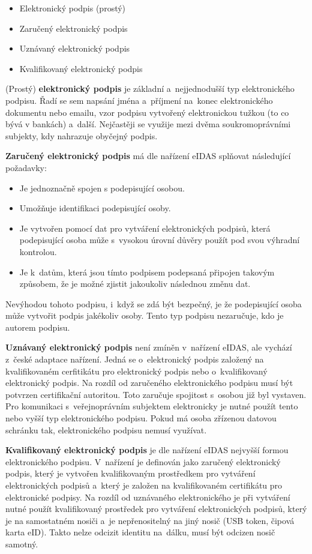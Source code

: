 \begin{itemize}
    \item Elektronický podpis (prostý)
    \item Zaručený elektronický podpis
    \item Uznávaný elektronický podpis
    \item Kvalifikovaný elektronický podpis
\end{itemize}

(Prostý) \textbf{elektronický podpis} je základní a~nejjednodušší typ elektronického podpisu. Řadí se sem napsání jména a~příjmení na~konec elektronického dokumentu nebo emailu, vzor podpisu vytvořený elektronickou tužkou (to co bývá v bankách) a~další. Nejčastěji se využije mezi dvěma soukromoprávními subjekty, kdy nahrazuje obyčejný podpis.

\textbf{Zaručený elektronický podpis} má dle nařízení eIDAS splňovat následující požadavky:

\begin{itemize}
    \item Je jednoznačně spojen s podepisující osobou.
    \item Umožňuje identifikaci podepisující osoby.
    \item Je vytvořen pomocí dat pro vytváření elektronických podpisů, která podepisující osoba může s~vysokou úrovní důvěry použít pod svou výhradní kontrolou.
    \item Je k~datům, která jsou tímto podpisem podepsaná připojen takovým způsobem, že je možné zjistit jakoukoliv následnou změnu dat.
\end{itemize}

Nevýhodou tohoto podpisu, i~když se zdá být bezpečný, je že podepisující osoba může vytvořit podpis jakékoliv osoby. Tento typ podpisu nezaručuje, kdo je autorem podpisu. 

\textbf{Uznávaný elektronický podpis} není zmíněn v~nařízení eIDAS, ale vychází z~české adaptace nařízení. Jedná se o~elektronický podpis založený na kvalifikovaném cerfitikátu pro elektronický podpis nebo o~kvalifikovaný elektronický podpis. Na rozdíl od zaručeného elektronického podpisu musí být potvrzen certifikační autoritou. Toto zaručuje spojitost s~osobou již byl vystaven. Pro komunikaci s~veřejnoprávním subjektem elektronicky je nutné použít tento nebo vyšší typ elektronického podpisu. Pokud má osoba zřízenou datovou schránku tak, elektronického podpisu nemusí využívat.

\textbf{Kvalifikovaný elektronický podpis} je dle nařízení eIDAS nejvyšší formou elektronického podpisu. V~nařízení je definován jako zaručený elektronický podpis, který je vytvořen kvalifikovaným prostředkem pro vytváření elektronických podpisů a~který je založen na kvalifikovaném certifikátu pro elektronické podpisy. Na rozdíl od uznávaného elektronického je při vytváření nutné použít kvalifikovaný prostředek pro vytváření elektronických podpisů, který je na samostatném nosiči a~je nepřenositelný na jiný nosič (USB token, čipová karta eID). Takto nelze odcizit identitu na~dálku, musí být odcizen nosič samotný.

